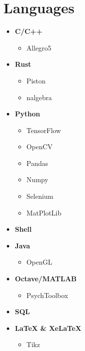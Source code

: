 \documentclass[]{chandan-cv}
\begin{document}
\begin{minipage}[t]{0.27\textwidth}


\section{Languages}
	\begin{itemize}
		\setlength\itemsep{-0.2em}
		\item \textbf{C/C++}
			\begin{itemize}
				\setlength\itemsep{-0.17em}
				\item Allegro5
			\end{itemize}
                \item \textbf{Rust}
                        \begin{itemize}
                                \setlength\itemsep{-0.17em}
                                \item Piston
                                \item nalgebra
                        \end{itemize}
		\item \textbf{Python}
			\begin{itemize}
				\setlength\itemsep{-0.17em}
				\item TensorFlow
				\item OpenCV
				\item Pandas
				\item Numpy
				\item Selenium
				\item MatPlotLib
			\end{itemize}
		\item \textbf{Shell}
                \item \textbf{Java}
                        \begin{itemize}
                                \setlength\itemsep{-0.17em}
                                \item OpenGL
                        \end{itemize}      
		\item \textbf{Octave/MATLAB}
			\begin{itemize}
				\setlength\itemsep{-0.17em}
				\item PsychToolbox
			\end{itemize}
		\item \textbf{SQL}
		\item \textbf{LaTeX \& XeLaTeX}
			\begin{itemize}
				\setlength\itemsep{-0.17em}
				\item Tikz
			\end{itemize}
	\end{itemize}
\sectionsep


\end{minipage}
\end{document}
